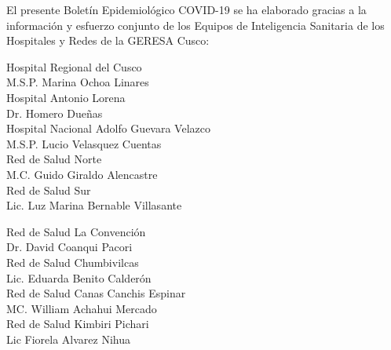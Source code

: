 \documentclass[12pt,a4paper,openany]{book}
\begin{document}
	\centering
		{\large El presente Boletín Epidemiológico COVID-19 se ha elaborado gracias a la información y esfuerzo conjunto de los Equipos de Inteligencia Sanitaria de los Hospitales y Redes de la GERESA Cusco:

		\vspace{0.5cm}
		\noindent
		\begin{minipage}[t]{.45\textwidth}
			\centering
			Hospital Regional del Cusco \\
			M.S.P. Marina Ochoa Linares \vspace{0.5cm}\\
			Hospital Antonio Lorena \\
			Dr. Homero Dueñas \vspace{.5cm}\\
			Hospital Nacional Adolfo Guevara Velazco\\
			M.S.P. Lucio Velasquez Cuentas \vspace{.5cm}\\
			Red de Salud Norte \\
			M.C. Guido Giraldo Alencastre\vspace{0.5cm}\\
			Red de Salud Sur\\
			Lic. Luz Marina Bernable Villasante \vspace{0.5cm}\\	
		\end{minipage}
		\hfill
		\noindent
		\begin{minipage}[t]{.45\textwidth}
			\centering
			Red de Salud La Convención\\
			Dr. David Coanqui Pacori\vspace{0.5cm}\\
			Red de Salud Chumbivilcas\\
			Lic. Eduarda Benito Calderón \vspace{.5cm}\\
			Red de Salud Canas Canchis Espinar\\
			MC. William Achahui Mercado \vspace{.5cm}\\
			Red de Salud Kimbiri Pichari \\
			Lic Fiorela Alvarez Nihua\vspace{0.5cm}\\	
		\end{minipage}
}
\end{document}
